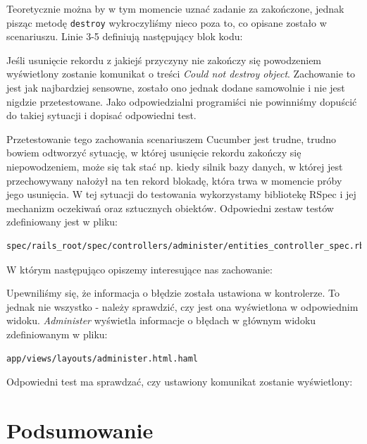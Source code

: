  	Teoretycznie można by w tym momencie uznać zadanie za zakończone, jednak pisząc metodę \texttt{destroy} wykroczyliśmy nieco poza to, co opisane zostało w scenariuszu. Linie 3-5 definiują następujący blok kodu:
 	
 	
 	
 	Jeśli usunięcie rekordu z jakiejś przyczyny nie zakończy się powodzeniem wyświetlony zostanie komunikat o treści \emph{Could not destroy object}.
 	Zachowanie to jest jak najbardziej sensowne, zostało ono jednak dodane samowolnie i nie jest nigdzie przetestowane. Jako odpowiedzialni programiści nie powinniśmy dopuścić do takiej sytuacji i dopisać odpowiedni test. 
 	
 	Przetestowanie tego zachowania scenariuszem Cucumber jest trudne, trudno bowiem odtworzyć sytuację, w której usunięcie rekordu zakończy się niepowodzeniem, może się tak stać np. kiedy silnik bazy danych, w której jest przechowywany nałożył na ten rekord blokadę, która trwa w momencie próby jego usunięcia. W tej sytuacji do testowania wykorzystamy bibliotekę RSpec i jej mechanizm oczekiwań oraz sztucznych obiektów. Odpowiedni zestaw testów zdefiniowany jest w pliku:
 	
\begin{lstlisting}
spec/rails_root/spec/controllers/administer/entities_controller_spec.rb
\end{lstlisting}
	
 	W którym następująco opiszemy interesujące nas zachowanie:
 	
 	
 	
 	Upewniliśmy się, że informacja o błędzie została ustawiona w kontrolerze. To jednak nie wszystko - należy sprawdzić, czy jest ona wyświetlona w odpowiednim widoku. \emph{Administer} wyświetla informacje o błędach w głównym widoku zdefiniowanym w pliku:
 	
\begin{lstlisting}
app/views/layouts/administer.html.haml
\end{lstlisting}
 	
 	Odpowiedni test ma sprawdzać, czy ustawiony komunikat zostanie wyświetlony:
 	
 	
  
  \section{Podsumowanie}
  
